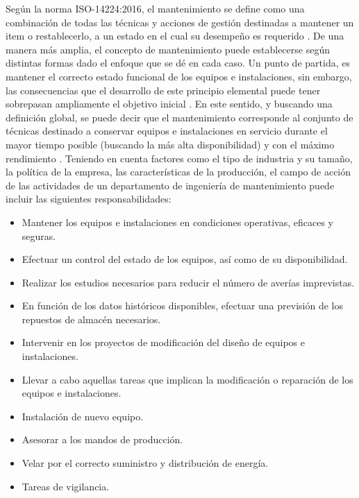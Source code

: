 Según la norma ISO-14224:2016, el mantenimiento se define como una combinación de todas las técnicas y acciones de gestión destinadas a mantener un item o restablecerlo, a un estado en el cual su desempeño es requerido \parencite{iso2016}. De una manera más amplia, el concepto de mantenimiento puede establecerse según distintas formas dado el enfoque que se dé en cada caso. Un punto de partida, es mantener el correcto estado funcional de los equipos e instalaciones, sin embargo, las consecuencias que el desarrollo de este principio elemental puede tener sobrepasan ampliamente el objetivo inicial \parencite{gomez1998}. En este sentido, y buscando una definición global, se puede decir que el mantenimiento corresponde al conjunto de técnicas destinado a conservar equipos e instalaciones en servicio durante el mayor tiempo posible (buscando la más alta disponibilidad) y con el máximo rendimiento \parencite{garcia2010}.
Teniendo en cuenta factores como el tipo de industria y su tamaño, la política de la empresa, las características de la producción, el campo de acción de las actividades de un departamento de ingeniería de mantenimiento puede incluir las siguientes responsabilidades\parencite{gomez1998}: \\

\begin{itemize}
\item Mantener los equipos e instalaciones en condiciones operativas, eficaces y seguras.
\item Efectuar un control del estado de los equipos, así como de su disponibilidad.
\item Realizar los estudios necesarios para reducir el número de averías imprevistas.
\item En función de los datos históricos disponibles, efectuar una previsión de los repuestos de almacén necesarios.
\item Intervenir en los proyectos de modificación del diseño de equipos e instalaciones.
\item Llevar a cabo aquellas tareas que implican la modificación o reparación de los equipos e instalaciones.
\item Instalación de nuevo equipo.
\item Asesorar a los mandos de producción.
\item Velar por el correcto suministro y distribución de energía.
\item Tareas de vigilancia.
\end{itemize}

